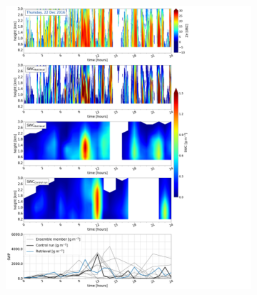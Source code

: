     \begin{figure}\ContinuedFloat
   		\centering
		\begin{subfigure}[b]{0.8\textwidth}
			\includegraphics[trim={0.5cm 0.5cm 17.5cm .5cm},clip,width=\textwidth]{./fig_SWC/20161222}
			\caption{}\label{fig:SWC22}
		\end{subfigure}
	\end{figure}
